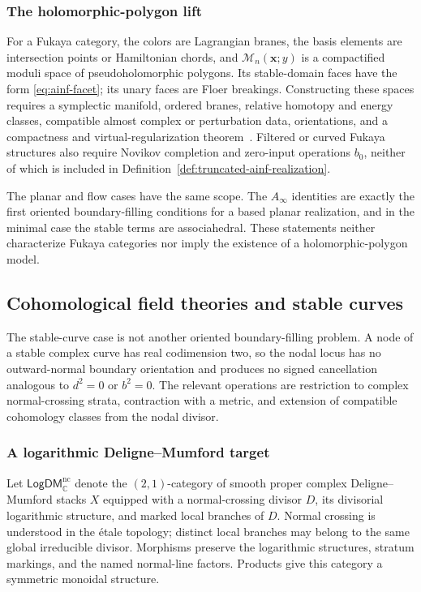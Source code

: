 \documentclass[11pt,letterpaper,twoside]{article}
\theoremstyle{plain}
\theoremstyle{definition}
\theoremstyle{remark}
\let\cite\citep
\newcommand{\Ainf}{A_\infty}
\begin{document}
\subsubsection{The holomorphic-polygon lift}

For a Fukaya category, the colors are Lagrangian branes, the basis elements are intersection points or Hamiltonian chords, and \(\mathcal M_n(\mathbf x;y)\) is a compactified moduli space of pseudoholomorphic polygons.  Its stable-domain faces have the form \eqref{eq:ainf-facet}; its unary faces are Floer breakings.  Constructing these spaces requires a symplectic manifold, ordered branes, relative homotopy and energy classes, compatible almost complex or perturbation data, orientations, and a compactness and virtual-regularization theorem~\cite{fooo2009,fooo2020,seidel2008}.  Filtered or curved Fukaya structures also require Novikov completion and zero-input operations \(b_0\), neither of which is included in Definition~\ref{def:truncated-ainf-realization}.

The planar and flow cases have the same scope.  The \(\Ainf\) identities are exactly the first oriented boundary-filling conditions for a based planar realization, and in the minimal case the stable terms are associahedral.  These statements neither characterize Fukaya categories nor imply the existence of a holomorphic-polygon model.

\subsection{Cohomological field theories and stable curves}\label{sec:cohft}

The stable-curve case is not another oriented boundary-filling problem.  A node of a stable complex curve has real codimension two, so the nodal locus has no outward-normal boundary orientation and produces no signed cancellation analogous to \(d^2=0\) or \(b^2=0\).  The relevant operations are restriction to complex normal-crossing strata, contraction with a metric, and extension of compatible cohomology classes from the nodal divisor.

\subsubsection{A logarithmic Deligne--Mumford target}

Let \(\mathsf{LogDM}_{\mathbb C}^{\mathrm{nc}}\) denote the \((2,1)\)-category of smooth proper complex Deligne--Mumford stacks \(X\) equipped with a normal-crossing divisor \(D\), its divisorial logarithmic structure, and marked local branches of \(D\).  Normal crossing is understood in the \'etale topology; distinct local branches may belong to the same global irreducible divisor.  Morphisms preserve the logarithmic structures, stratum markings, and the named normal-line factors.  Products give this category a symmetric monoidal structure.
\end{document}
